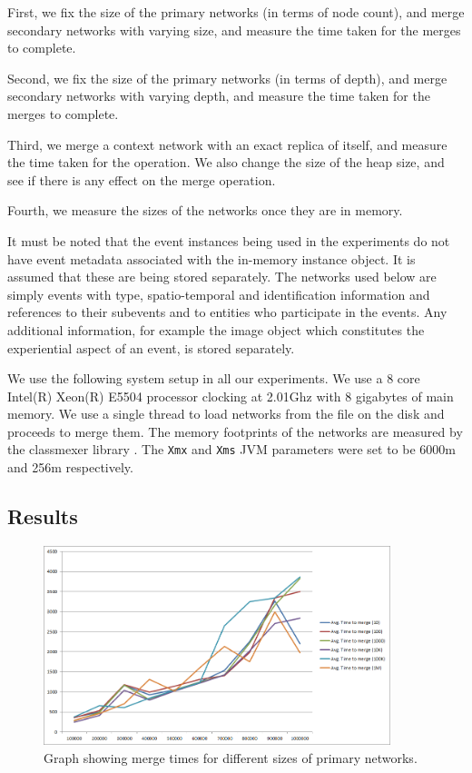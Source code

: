 First, we fix the size of the primary networks (in terms of node count), and merge secondary networks with varying size, and measure the time taken for the merges to complete.

Second, we fix the size of the primary networks (in terms of depth), and merge secondary networks with varying depth, and measure the time taken for the merges to complete.

Third, we merge a context network with an exact replica of itself, and measure the time taken for the operation. We also change the size of the heap size, and see if there is any effect on the merge operation.

Fourth, we measure the sizes of the networks once they are in memory.

It must be noted that the event instances being used in the experiments do not have event metadata associated with the in-memory instance object. It is assumed that these are being stored separately. The networks used below are simply events with type, spatio-temporal and identification information and references to their subevents and to entities who participate in the events. Any additional information, for example the image object which constitutes the experiential aspect of an event, is stored separately.

We use the following system setup in all our experiments. We use a 8 core Intel(R) Xeon(R) E5504 processor clocking at 2.01Ghz with 8 gigabytes of main memory. We use a single thread to load networks from the file on the disk and proceeds to merge them. The memory footprints of the networks are measured by the classmexer library \cite{classmexer}. The \texttt{Xmx} and \texttt{Xms} JVM parameters were set to be 6000m and 256m respectively.

\subsection{Results}

\begin{figure}[t]
\centering
\includegraphics[width=0.9\textwidth]{media/chapter5/perf/mergebignodetest.png}
\caption{Graph showing merge times for different sizes of primary networks.}
\label{fig:agg}
\end{figure}

